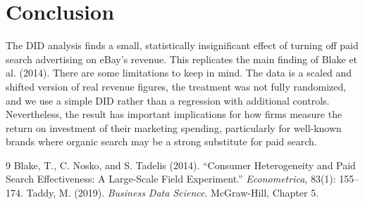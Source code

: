 \documentclass[12pt]{article}
\begin{document}
\section{Conclusion}
The DID analysis finds a small, statistically insignificant effect of turning off paid search advertising on eBay's revenue. This replicates the main finding of Blake et al. (2014). There are some limitations to keep in mind. The data is a scaled and shifted version of real revenue figures, the treatment was not fully randomized, and we use a simple DID rather than a regression with additional controls. Nevertheless, the result has important implications for how firms measure the return on investment of their marketing spending, particularly for well-known brands where organic search may be a strong substitute for paid search.
\begin{thebibliography}{9}
Blake, T., C. Nosko, and S. Tadelis (2014).
``Consumer Heterogeneity and Paid Search Effectiveness: A Large-Scale Field Experiment.''
\textit{Econometrica}, 83(1): 155--174.
Taddy, M. (2019).
\textit{Business Data Science}. McGraw-Hill, Chapter 5.
\end{thebibliography}
\end{document}
